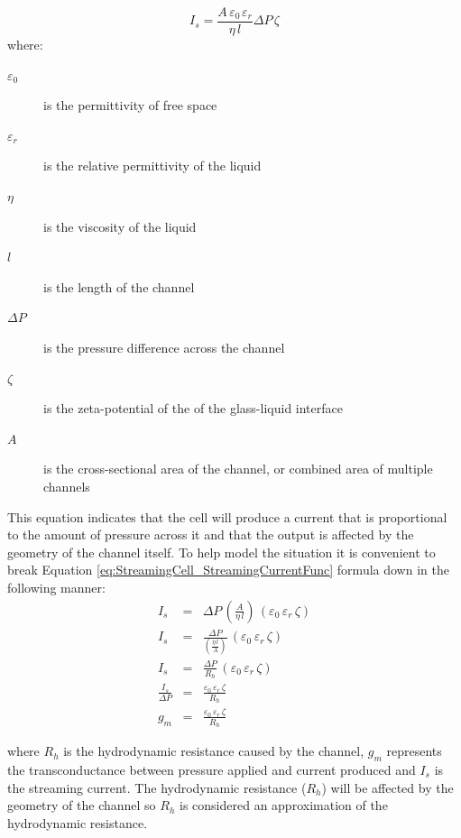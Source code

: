 \begin{equation}
I_{s}=\frac{A\,\varepsilon_{0\,}\varepsilon_{r}}{\eta\, l}\Delta P\,\zeta\label{eq:StreamingCell_StreamingCurrentFunc}
\end{equation}
where:
\begin{description}
\item [{$\varepsilon_{0}$}] is the permittivity of free space
\item [{$\varepsilon_{r}$}] is the relative permittivity of the liquid
\item [{$\eta$}] is the viscosity of the liquid
\item [{$l$}] is the length of the channel
\item [{$\Delta P$}] is the pressure difference across the channel
\item [{$\zeta$}] is the zeta-potential of the of the glass-liquid interface
\item [{$A$}] is the cross-sectional area of the channel, or combined
area of multiple channels
\end{description}
This equation indicates that the cell will produce a current that
is proportional to the amount of pressure across it and that the output
is affected by the geometry of the channel itself. To help model the
situation it is convenient to break Equation \ref{eq:StreamingCell_StreamingCurrentFunc}
formula down in the following manner:
\begin{eqnarray}
I_{s} & = & \Delta P\,\left(\frac{A}{\eta\, l}\right)\,\left(\varepsilon_{0}\,\varepsilon_{r}\,\zeta\right)\nonumber \\
I_{s} & = & \frac{\Delta P}{\left(\frac{\eta\, l}{A}\right)}\,\left(\varepsilon_{0}\,\varepsilon_{r}\,\zeta\right)\nonumber \\
I_{s} & = & \frac{\Delta P}{R_{h}}\,\left(\varepsilon_{0}\,\varepsilon_{r}\,\zeta\right)\label{eq:StreamingCurrent_HydrostaticResistance}\\
\frac{I_{s}}{\Delta P} & = & \frac{\varepsilon_{0}\,\varepsilon_{r}\,\zeta}{R_{h}}\nonumber \\
g_{m} & = & \frac{\varepsilon_{0}\,\varepsilon_{r}\,\zeta}{R_{h}}\nonumber
\end{eqnarray}


where $R_{h}$ is the hydrodynamic resistance caused by the channel,
$g_{m}$ represents the transconductance between pressure applied
and current produced and $I_{s}$ is the streaming current. The hydrodynamic
resistance ($R_{h}$) will be affected by the geometry of the channel
so $R_{h}$ is considered an approximation of the hydrodynamic resistance.

